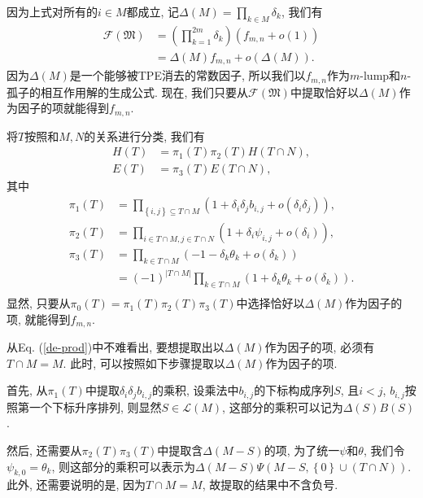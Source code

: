 \documentclass[12pt,a4paper,UTF8]{article}
\numberwithin{equation}{section}
\newcommand{\sbrace}[1]{\left(#1\right)}
\newcommand{\bbrace}[1]{\left\{#1\right\}}
\newcommand{\FM}{\mathfrak{M}}
\newcommand{\CF}{\mathcal{F}}
\newcommand{\refeqn}[1]{Eq. (\ref{#1})}
\newcommand{\MLNS}{$m$-lump和$n$-孤子的相互作用解}
\begin{document}
因为上式对所有的$i\in M$都成立, 记$\Delta(M)=\prod_{k\in M}{\delta_k}$, 我们有
\begin{equation}
\begin{aligned}
  \CF(\FM)&=\sbrace{\prod_{k=1}^{2m}{\delta_k}}\sbrace{f_{m,n}+o(1)}\\
  &=\Delta(M)f_{m,n}+o\sbrace{\Delta(M)}. 
\end{aligned}
\label{fmn-o}
\end{equation}
因为$\Delta(M)$是一个能够被TPE消去的常数因子, 所以我们以$f_{m,n}$作为\MLNS{}的生成公式. 现在, 我们只要从$\CF(\FM)$中提取恰好以$\Delta(M)$作为因子的项就能得到$f_{m,n}$.

将$T$按照和$M,N$的关系进行分类, 我们有
\begin{equation}
\begin{aligned}
  H(T)&=\pi_1(T)\pi_2(T)H(T\cap N), \\ 
  E(T)&=\pi_3(T)E(T\cap N),
\end{aligned}
\end{equation}
其中
\begin{equation}
\begin{aligned}
  \pi_1(T)&=\prod_{\bbrace{i,j}\subseteq T\cap M}\sbrace{1+\delta_i \delta_j b_{i,j}+o(\delta_i \delta_j)} ,\\
  \pi_2(T)&=\prod_{i\in T\cap M,j\in T\cap N}\sbrace{1+\delta_i \psi_{i,j}+o(\delta_i)} ,\\
  \pi_3(T)&=\prod_{k\in T\cap M}\sbrace{-1-\delta_k \theta_k+o(\delta_k)} \\
  &=(-1)^{|T\cap M|}\prod_{k\in T\cap M}\sbrace{1+\delta_k \theta_k+o(\delta_k)}.\\
\end{aligned}
\label{de-prod}
\end{equation}
显然, 只要从$\pi_0(T)=\pi_1(T)\pi_2(T)\pi_3(T)$中选择恰好以$\Delta(M)$作为因子的项, 就能得到$f_{m,n}$. 

从\refeqn{de-prod}中不难看出, 要想提取出以$\Delta(M)$作为因子的项, 必须有$T\cap M=M$. 此时, 可以按照如下步骤提取以$\Delta(M)$作为因子的项.

首先, 从$\pi_1(T)$中提取$\delta_i \delta_j b_{i,j}$的乘积, 设乘法中$b_{i,j}$的下标构成序列$S$, 且$i<j$, $b_{i,j}$按照第一个下标升序排列, 则显然$S\in \mathcal L(M)$, 这部分的乘积可以记为$\Delta(S)B(S)$. 

然后, 还需要从$\pi_2(T)\pi_3(T)$中提取含$\Delta(M-S)$的项, 为了统一$\psi$和$\theta$, 我们令$\psi_{k,0}=\theta_k$, 则这部分的乘积可以表示为$\Delta(M-S)\Psi(M-S,\bbrace{0}\cup (T\cap N))$. 此外, 还需要说明的是, 因为$T\cap M=M$, 故提取的结果中不含负号. 
\end{document}
